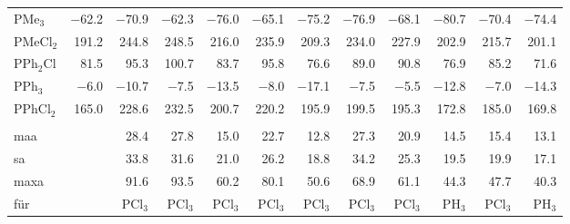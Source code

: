 \begin{table}[ht!]
{\begin{tabular}{lr|rrrrr|rrrrr}
    PMe$_{3}$  & $-$62.2 & $-$70.9 & $-$62.3 & $-$76.0 & $-$65.1 & $-$75.2 & $-$76.9 & $-$68.1 & $-$80.7 & $-$70.4 & $-$74.4 \\
    PMeCl$_{2}$ & 191.2 & 244.8 & 248.5 & 216.0 & 235.9 & 209.3 & 234.0 & 227.9 & 202.9 & 215.7 & 201.1 \\
    PPh$_{2}$Cl & 81.5  & 95.3  & 100.7 & 83.7  & 95.8  & 76.6  & 89.0  & 90.8  & 76.9  & 85.2  & 71.6 \\
    PPh$_{3}$  & $-$6.0  & $-$10.7 & $-$7.5  & $-$13.5 & $-$8.0  & $-$17.1 & $-$7.5  & $-$5.5  & $-$12.8 & $-$7.0  & $-$14.3 \\
    PPhCl$_{2}$ & 165.0 & 228.6 & 232.5 & 200.7 & 220.2 & 195.9 & 199.5 & 195.3 & 172.8 & 185.0 & 169.8 \\
          &       &       &       &       &       &       &       &       &       &       &  \\
    \ac{maa}   &       & 28.4  & 27.8  & 15.0  & 22.7  & 12.8  & 27.3  & 20.9  & 14.5  & 15.4  & 13.1 \\
    \ac{sa}   &       & 33.8  & 31.6  & 21.0  & 26.2  & 18.8  & 34.2  & 25.3  & 19.5  & 19.9  & 17.1 \\
    \ac{maxa}  &       & 91.6  & 93.5  & 60.2  & 80.1  & 50.6  & 68.9  & 61.1  & 44.3  & 47.7  & 40.3 \\
    für & & PCl$_{3}$ & PCl$_{3}$ & PCl$_{3}$ & PCl$_{3}$ & PCl$_{3}$ & PCl$_{3}$ & PCl$_{3}$ & PH$_{3}$ & PCl$_{3}$ & PH$_{3}$
    \end{tabular}%
  \label{tab:pshifts}}%
\end{table}%
\vfill
\newpage
